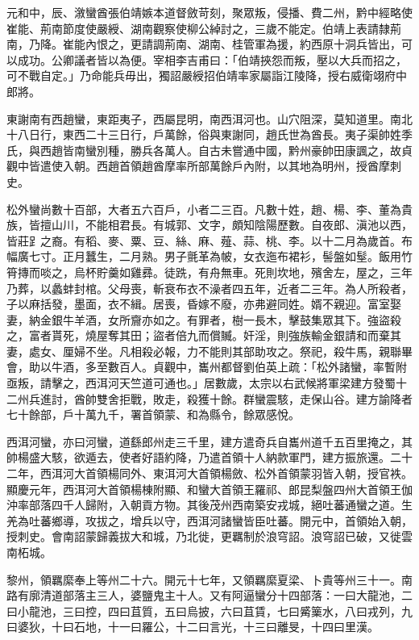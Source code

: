 \begin{pinyinscope}
 元和中，辰、漵蠻酋張伯靖嫉本道督斂苛刻，聚眾叛，侵播、費二州，黔中經略使崔能、荊南節度使嚴綬、湖南觀察使柳公綽討之，三歲不能定。伯靖上表請隸荊南，乃降。崔能內恨之，更請調荊南、湖南、桂管軍為援，約西原十洞兵皆出，可以成功。公卿議者皆以為便。宰相李吉甫曰：「伯靖挾怨而叛，壓以大兵而招之，可不戰自定。」乃命能兵毋出，獨詔嚴綬招伯靖率家屬詣江陵降，授右威衛翊府中郎將。



 東謝南有西趙蠻，東距夷子，西屬昆明，南西洱河也。山穴阻深，莫知道里。南北十八日行，東西二十三日行，戶萬餘，俗與東謝同，趙氏世為酋長。夷子渠帥姓季氏，與西趙皆南蠻別種，勝兵各萬人。自古未嘗通中國，黔州豪帥田康諷之，故貞觀中皆遣使入朝。西趙首領趙酋摩率所部萬餘戶內附，以其地為明州，授酋摩刺史。



 松外蠻尚數十百部，大者五六百戶，小者二三百。凡數十姓，趙、楊、李、董為貴族，皆擅山川，不能相君長。有城郭、文字，頗知陰陽歷數。自夜郎、滇池以西，皆莊𧾷之裔。有稻、麥、粟、豆、絲、麻、薤、蒜、桃、李。以十二月為歲首。布幅廣七寸。正月蠶生，二月熟。男子氈革為帔，女衣迤布裙衫，髻盤如髽。飯用竹筲摶而啖之，烏杯貯羹如雞彞。徒跣，有舟無車。死則坎地，殯舍左，屋之，三年乃葬，以蠡蚌封棺。父母喪，斬衰布衣不澡者四五年，近者二三年。為人所殺者，子以麻括發，墨面，衣不緝。居喪，昏嫁不廢，亦弗避同姓。婿不親迎。富室娶妻，納金銀牛羊酒，女所齎亦如之。有罪者，樹一長木，擊鼓集眾其下。強盜殺之，富者貰死，燒屋奪其田；盜者倍九而償贓。奸淫，則強族輸金銀請和而棄其妻，處女、厘婦不坐。凡相殺必報，力不能則其部助攻之。祭祀，殺牛馬，親聯畢會，助以牛酒，多至數百人。貞觀中，巂州都督劉伯英上疏：「松外諸蠻，率暫附亟叛，請擊之，西洱河天竺道可通也。」居數歲，太宗以右武候將軍梁建方發蜀十二州兵進討，酋帥雙舍拒戰，敗走，殺獲十餘。群蠻震駭，走保山谷。建方諭降者七十餘部，戶十萬九千，署首領蒙、和為縣令，餘眾感悅。



 西洱河蠻，亦曰河蠻，道繇郎州走三千里，建方遣奇兵自巂州道千五百里掩之，其帥楊盛大駭，欲遁去，使者好語約降，乃遣首領十人納款軍門，建方振旅還。二十二年，西洱河大首領楊同外、東洱河大首領楊斂、松外首領蒙羽皆入朝，授官袟。顯慶元年，西洱河大首領楊棟附顯、和蠻大首領王羅祁、郎昆梨盤四州大首領王伽沖率部落四千人歸附，入朝貢方物。其後茂州西南築安戎城，絕吐蕃通蠻之道。生羌為吐蕃鄉導，攻拔之，增兵以守，西洱河諸蠻皆臣吐蕃。開元中，首領始入朝，授刺史。會南詔蒙歸義拔大和城，乃北徙，更羈制於浪穹詔。浪穹詔已破，又徙雲南柘城。



 黎州，領羈縻奉上等州二十六。開元十七年，又領羈縻夏梁、卜貴等州三十一。南路有廓清道部落主三人，婆鹽鬼主十人。又有阿逼蠻分十四部落：一曰大龍池，二曰小龍池，三曰控，四曰苴質，五曰烏披，六曰苴賃，七曰觱篥水，八曰戎列，九曰婆狄，十曰石地，十一曰羅公，十二曰言光，十三曰離旻，十四曰里漢。




\end{pinyinscope}
